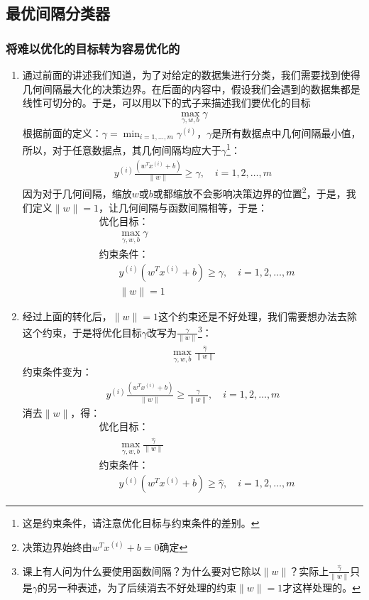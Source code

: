 \subsection{最优间隔分类器}
\subsubsection{将难以优化的目标转为容易优化的}
\begin{enumerate}
	\item 通过前面的讲述我们知道，为了对给定的数据集进行分类，我们需要找到使得几何间隔最大化的决策边界。在后面的内容中，假设我们会遇到的数据集都是线性可切分的。于是，可以用以下的式子来描述我们要优化的目标
	\begin{align}
		\max_{\gamma, w, b} \gamma
	\end{align}
	根据前面的定义：$\gamma = \min_{i=1,\dots,m}\gamma^{(i)}$，$\gamma$是所有数据点中几何间隔最小值，所以，对于任意数据点，其几何间隔均应大于$\gamma$\footnote{这是约束条件，请注意优化目标与约束条件的差别。}：
	\begin{align}
		y^{(i)}\frac{(w^Tx^{(i)}+b)}{\|w\|} \geq \gamma, \quad i=1, 2, \dots, m
	\end{align}
	因为对于几何间隔，缩放$w$或$b$或都缩放不会影响决策边界的位置\footnote{决策边界始终由$w^Tx^{(i)}+b=0$确定}，于是，我们定义$\|w\|=1$，让几何间隔与函数间隔相等，于是：
	\begin{align}
		&\text{优化目标：} \\
		& \qquad \max_{\gamma, w, b} \gamma \\
		&\text{约束条件：} \\
		& \qquad y^{(i)}(w^Tx^{(i)}+b) \geq \gamma, \quad i=1, 2, \dots, m \\
		& \qquad \|w\| = 1
	\end{align}

	\item 经过上面的转化后，$\|w\|=1$这个约束还是不好处理，我们需要想办法去除这个约束，于是将优化目标$\gamma$改写为$\frac{\hat{\gamma}}{\|w\|}$\footnote{课上有人问为什么要使用函数间隔？为什么要对它除以$\|w\|$？实际上$\frac{\hat{\gamma}}{\|w\|}$只是$\gamma$的另一种表述，为了后续消去不好处理的约束$\|w\| = 1$才这样处理的。}：
	\begin{align}
		\max_{\gamma, w, b} \frac{\hat{\gamma}}{\|w\|}
	\end{align}
	约束条件变为：
	\begin{align}
		y^{(i)}\frac{(w^Tx^{(i)}+b)}{\|w\|} \geq \frac{\hat{\gamma}}{\|w\|}, \quad i=1, 2, \dots, m
	\end{align}
	消去$\|w\|$，得：
	\begin{align}
		&\text{优化目标：} \\
		& \qquad \max_{\gamma, w, b} \frac{\hat{\gamma}}{\|w\|} \\
		&\text{约束条件：} \\
		& \qquad y^{(i)}(w^Tx^{(i)}+b) \geq \hat{\gamma}, \quad i=1, 2, \dots, m
	\end{align}
	

\end{enumerate}
